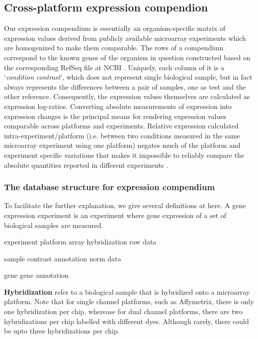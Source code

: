 \subsection{Cross-platform expression compendion}

Our expression compendium is essentially an organism-specific matrix of
expression values derived from publicly available microarray experiments which
are homogenized to make them comparable.
%
The rows of a compendium correspond to the known genes of the organism in
question constructed based on the corresponding RefSeq file at NCBI
\cite{Pruitt2007}.
%
Uniquely, each column of it is a `\textit{condition contrast}', which does not
represent single biological sample, but in fact always represents the
differences between a pair of samples, one as test and the other reference.
%
Consequently, the expression values themselves are calculated as expression
log-ratios.
%
Converting absolute measurements of expression into expression changes is the
principal means for rendering expression values comparable across platforms and
experiments.
%
Relative expression calculated intra-experiment/platform (i.e. between two
conditions measured in the same microarray experiment using one platform)
negates much of the platform and experiment specific variations that makes it
impossible to reliably compare the absolute quantities reported in different
experiments \cite{Shi2006}.


\subsubsection{The database structure for expression compendium}



To facilitate the further explanation, we give several definitions at here. 
%
A gene expression experiment is an experiment where gene expression of a set of 
biological samples are measured. 


experiment
platform
array
hybridization
raw data

sample
contrast
annotation
norm data

gene
gene annotation

\textbf{Hybridization} refer to a biological sample that is hybridized onto a
microarray platform.
%
Note that for single channel platforms, such as Affymetrix, there is only one
hybridization per chip, wherease for dual channel platforms, there are two
hybridizations per chip labelled with different dyes.
%
Although rarely, there could be upto three hybridizations per chip. 




